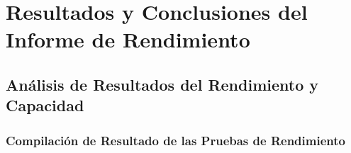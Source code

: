 \documentclass[
  paper=a4,
  ,captions=tableheading
]{scrartcl}
\renewenvironment{quote}{\begin{customblockquote}\list{}{\rightmargin=0em\leftmargin=0em}%
\item\relax\color{blockquote-text}\ignorespaces}{\unskip\unskip\endlist\end{customblockquote}}
\begin{document}
\newpage

\section{Resultados y Conclusiones del Informe de
Rendimiento}\label{sec:resultados-y-conclusiones-del-informe-de-rendimiento}

\subsection{Análisis de Resultados del Rendimiento y
Capacidad}\label{sec:anuxe1lisis-de-resultados-del-rendimiento-y-capacidad}

\begin{quote}
\end{quote}

\subsubsection{Compilación de Resultado de las Pruebas de
Rendimiento}\label{sec:compilaciuxf3n-de-resultado-de-las-pruebas-de-rendimiento}
\end{document}
